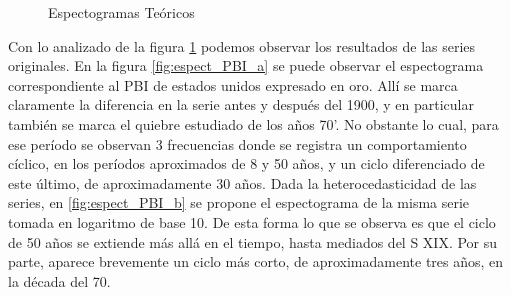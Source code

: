 \documentclass[a4paper]{article}
\begin{document}
\begin{figure}[H]
	\caption{Espectogramas Teóricos} \label{fig:espect_teo}
\end{figure}

Con lo analizado de la figura \ref{fig:espect_teo} podemos observar los resultados de las series originales. En la figura \ref{fig:espect_PBI_a} se puede observar el espectograma correspondiente al PBI de estados unidos expresado en oro. Allí se marca claramente la diferencia en la serie antes y después del 1900, y en particular también se marca el quiebre estudiado de los años 70'. No obstante lo cual, para ese período se observan 3 frecuencias donde se registra un comportamiento cíclico, en los períodos aproximados de 8 y 50 años, y un ciclo diferenciado de este último, de aproximadamente 30 años. Dada la heterocedasticidad de las series, en \ref{fig:espect_PBI_b} se propone el espectograma de la misma serie tomada en logaritmo de base 10. De esta forma lo que se observa es que el ciclo de 50 años se extiende más allá en el tiempo, hasta mediados del S XIX. Por su parte, aparece brevemente un ciclo más corto, de aproximadamente tres años, en la década del 70.
\end{document}
